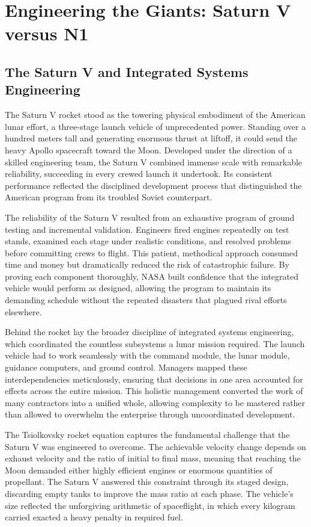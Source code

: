 \section{Engineering the Giants: Saturn V versus N1}

\subsection{The Saturn V and Integrated Systems Engineering}
The Saturn V rocket stood as the towering physical embodiment of the American lunar effort, a three-stage launch vehicle of unprecedented power. Standing over a hundred meters tall and generating enormous thrust at liftoff, it could send the heavy Apollo spacecraft toward the Moon. Developed under the direction of a skilled engineering team, the Saturn V combined immense scale with remarkable reliability, succeeding in every crewed launch it undertook. Its consistent performance reflected the disciplined development process that distinguished the American program from its troubled Soviet counterpart.

The reliability of the Saturn V resulted from an exhaustive program of ground testing and incremental validation. Engineers fired engines repeatedly on test stands, examined each stage under realistic conditions, and resolved problems before committing crews to flight. This patient, methodical approach consumed time and money but dramatically reduced the risk of catastrophic failure. By proving each component thoroughly, NASA built confidence that the integrated vehicle would perform as designed, allowing the program to maintain its demanding schedule without the repeated disasters that plagued rival efforts elsewhere.

Behind the rocket lay the broader discipline of integrated systems engineering, which coordinated the countless subsystems a lunar mission required. The launch vehicle had to work seamlessly with the command module, the lunar module, guidance computers, and ground control. Managers mapped these interdependencies meticulously, ensuring that decisions in one area accounted for effects across the entire mission. This holistic management converted the work of many contractors into a unified whole, allowing complexity to be mastered rather than allowed to overwhelm the enterprise through uncoordinated development.

The Tsiolkovsky rocket equation captures the fundamental challenge that the Saturn V was engineered to overcome. The achievable velocity change depends on exhaust velocity and the ratio of initial to final mass, meaning that reaching the Moon demanded either highly efficient engines or enormous quantities of propellant. The Saturn V answered this constraint through its staged design, discarding empty tanks to improve the mass ratio at each phase. The vehicle's size reflected the unforgiving arithmetic of spaceflight, in which every kilogram carried exacted a heavy penalty in required fuel.

